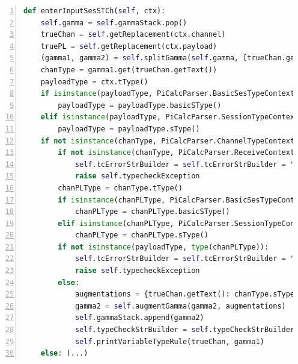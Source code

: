 \documentclass{l4proj}
\begin{document}
\begin{lstlisting}[language=Python, float=p, caption={\texttt{enterInputSesSTCh}, the function used to typecheck a session-typed input process. \texttt{ctx} is as described in Listing \ref{lst:encCode}. \texttt{self.getReplacement} returns the variable which replaces the channel or payload, should either of those be the dummy variable of a process naming declaration. \texttt{self.splitGamma} represents the context split operator. It is passed the typing context to split and a list of variables which if linear should be placed in the first context, with all other linear variables placed in the second. The function then retrieves the types of the channel and the payload, and checks if the channel is a standard channel or a receive session. It then checks that the type of the payload matches the channel type's payload type. The function then prepares the typing context for the continuation process and adds the typing rule into the typechecking output. \texttt{self.printVariableTypeRule} inserts into the typechecking output the typing rule for the channel i.e. T-Var. The final \texttt{else} clause is the code for rule T-StndIn and is near identical to lines 16-29, so it has been omitted for sake of brevity. $\square$ is used as a placeholder for typing rules, $\triangle$ is used as a placeholder for commas as a separator between the rules.}, label={lst:sTChCode}, extendedchars=True, numbers=left]
def enterInputSesSTCh(self, ctx):
	self.gamma = self.gammaStack.pop()
	trueChan = self.getReplacement(ctx.channel)
	truePL = self.getReplacement(ctx.payload)
	(gamma1, gamma2) = self.splitGamma(self.gamma, [trueChan.getText()])
	chanType = gamma1.get(trueChan.getText())
	payloadType = ctx.tType()
	if isinstance(payloadType, PiCalcParser.BasicSesTypeContext):
		payloadType = payloadType.basicSType()
	elif isinstance(payloadType, PiCalcParser.SessionTypeContext):
		payloadType = payloadType.sType()
	if not isinstance(chanType, PiCalcParser.ChannelTypeContext):
		if not isinstance(chanType, PiCalcParser.ReceiveContext):
			self.tcErrorStrBuilder = self.tcErrorStrBuilder = "<span class='error'>ERROR: Typechecking rule T-In failed due to " + trueChan.getText() + ". Input process on channel not of receive type.</span>\n"
			raise self.typecheckException
		chanPLType = chanType.tType()
		if isinstance(chanPLType, PiCalcParser.BasicSesTypeContext):
			chanPLType = chanPLType.basicSType()
		elif isinstance(chanPLType, PiCalcParser.SessionTypeContext):
			chanPLType = chanPLType.sType()
		if not isinstance(payloadType, type(chanPLType)):
			self.tcErrorStrBuilder = self.tcErrorStrBuilder = "<span class='error'>ERROR: Typechecking rule T-In failed due to " + truePL.getText() + ". Input process payload has type annotation that does not match channel type.</span>\n"
			raise self.typecheckException
		else:
			augmentations = {trueChan.getText(): chanType.sType(), truePL.getText(): chanPLType}
			gamma2 = self.augmentGamma(gamma2, augmentations)
			self.gammaStack.append(gamma2)
			self.typeCheckStrBuilder = self.typeCheckStrBuilder.replace(u"(*@$\square$@*)", u"(*@$\square\triangle$@*)T-In(*@$\triangle\square$@*)", 1)
			self.printVariableTypeRule(trueChan, gamma1)
	else: (...)
\end{lstlisting}
\end{document}
